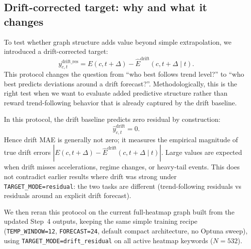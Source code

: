 \documentclass[pdflatex,sn-basic]{sn-jnl}
\begin{document}
\subsection{Drift-corrected target: why and what it changes}
To test whether graph structure adds value beyond simple extrapolation, we introduced a
drift-corrected target:
\[
y^{\text{drift\_res}}_{c,t}
=
E(c,t+\Delta)-\widehat{E}^{\text{drift}}(c,t+\Delta \mid t).
\]
This protocol changes the question from ``who best follows trend level?'' to
``who best predicts deviations around a drift forecast?''.
Methodologically, this is the right test when we want to evaluate added predictive structure rather
than reward trend-following behavior that is already captured by the drift baseline.

In this protocol, the drift baseline predicts zero residual by construction:
\[
\hat{y}^{\text{drift}}_{c,t}=0.
\]
Hence drift MAE is generally not zero; it measures the empirical magnitude of true drift errors
$|E(c,t+\Delta)-\widehat{E}^{\text{drift}}(c,t+\Delta\mid t)|$.
Large values are expected when drift misses accelerations, regime changes, or heavy-tail events.
This does not contradict earlier results where drift was strong under \texttt{TARGET\_MODE=residual}:
the two tasks are different (trend-following residuals vs residuals around an explicit drift forecast).

We then reran this protocol on the current full-heatmap graph built from the updated Step~4 outputs,
keeping the same simple training recipe
(\texttt{TEMP\_WINDOW=12}, \texttt{FORECAST=24}, default compact architecture, no Optuna sweep), using
\texttt{TARGET\_MODE=drift\_residual} on all active heatmap keywords (\(N=532\)).

\begin{table}[htbp]
\centering
\caption{Evaluation results under \texttt{TARGET\_MODE=drift\_residual} on the full heatmap.}
\label{tab:drift_residual_comparison}
\end{table}
\end{document}
